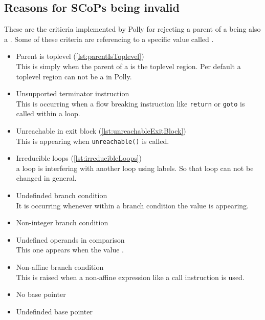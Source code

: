 \subsection{Reasons for SCoPs being invalid}
These are the critieria implemented by Polly for rejecting a parent of a \scop being also a \scop.
Some of these criteria are referencing to a \LLVM specific value called \undefv.\cite{llvmUndef}
\begin{itemize}
    \item Parent is toplevel (\autoref{lst:parentIsToplevel})\\
        This is simply when the parent of a \scop is the toplevel region.
        Per default a toplevel region can not be a \scop in Polly.
    \item Unsupported terminator instruction\\
        This is occurring when a flow breaking instruction like \texttt{return} or \texttt{goto} is called within a loop.
    \item Unreachable in exit block (\autoref{lst:unreachableExitBlock})\\
        This is appearing when \texttt{unreachable()} is called.\cite{llvmUnreachable}
    \item Irreducible loops (\autoref{lst:irreducibleLoops})\\
        \Eg a loop is interfering with another loop using labels.
        So that loop can not be changed in general.
    \item Undefinded branch condition\\
        It is occurring whenever within a branch condition the value \undefv is appearing.
    \item Non-integer branch condition\\
    \item Undefined operands in comparison\\
        This one appears when the value \undefv.
    \item Non-affine branch condition\\
        This is raised when a non-affine expression like a call instruction is used.
    \item No base pointer\\
    \item Undefinded base pointer\\

\end{itemize}
